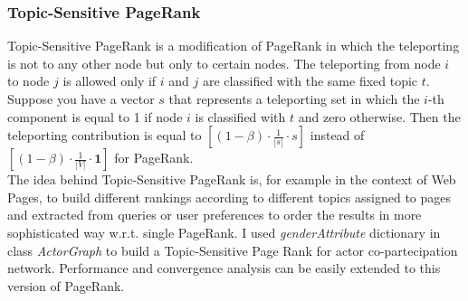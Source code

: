 \documentclass{article}
\begin{document}
\subsubsection{Topic-Sensitive PageRank}
Topic-Sensitive PageRank is a modification of PageRank in which the teleporting is not to any other node but only to certain nodes. The teleporting from node $i$ to node $j$ is allowed only if $i$ and $j$ are classified with the same fixed topic $t$. Suppose you have a vector $s$ that represents a teleporting set in which the $i$-th component is equal to 1 if node $i$ is classified with $t$ and zero otherwise. Then the teleporting contribution is equal to $[(1-\beta)\cdot\frac{1}{|s|}\cdot s]$ instead of $[(1-\beta)\cdot\frac{1}{|V|}\cdot\mathbf{1}]$ for PageRank.\\
The idea behind Topic-Sensitive PageRank is, for example in the context of Web Pages, to build different rankings according to different topics assigned to pages and extracted from queries or user preferences to order the results in more sophisticated way w.r.t. single PageRank. I used \textit{genderAttribute} dictionary in class \textit{ActorGraph} to build a Topic-Sensitive Page Rank for actor co-partecipation network. Performance and convergence analysis can be easily extended to this version of PageRank.
\end{document}
